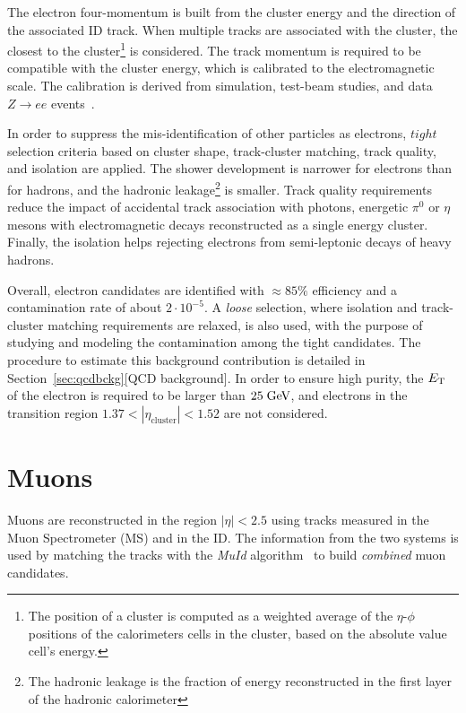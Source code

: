 The electron four-momentum is built from the cluster energy
and the direction of the associated ID track.
When multiple tracks are associated with the cluster, the closest
to the cluster\footnote{The position of a cluster 
is computed as a weighted average of the $\eta$-$\phi$ positions 
of the calorimeters cells in the cluster, based on the absolute 
value cell's energy.} is considered.
The track momentum is required to be compatible with the cluster energy,
which is calibrated to the electromagnetic scale. The calibration is
derived from simulation, test-beam studies, and data $Z\to ee$ 
events~\cite{elecalib}.

In order to suppress the mis-identification of other particles  
as electrons, $tight$ selection criteria based on cluster shape, 
track-cluster matching, track quality, and isolation are applied.
The shower development is narrower for electrons than for hadrons, and
the hadronic leakage\footnote{The hadronic leakage is the fraction of 
energy reconstructed in the first layer of the hadronic calorimeter}
is smaller. Track quality requirements reduce the impact of accidental 
track association with photons, energetic $\pi^0$ or $\eta$ mesons
with electromagnetic decays reconstructed as a single energy cluster.
Finally, the isolation helps rejecting electrons from semi-leptonic
decays of  heavy hadrons.

Overall, electron candidates are identified with \mbox{$\approx{}85\%$} 
efficiency and a contamination rate of about \mbox{$2\cdot{}10^{-5}$}.
A {\it loose} selection, where isolation and track-cluster matching
requirements are relaxed, is also used, with the purpose of studying
and modeling the contamination among the tight candidates. 
The procedure to estimate this background
contribution is detailed in Section~\ref{sec:qcdbckg}[QCD background].
In order to ensure high purity, the $\mbox{\ensuremath{E_{\mathrm{T}}}}$ of the electron is required
to be larger than \mbox{$25 \; \mathrm{GeV}{}$}, and electrons in the transition
region $1.37<|\eta_{\mathrm{cluster}}|<1.52$ are not considered.

\section{Muons}
\label{sec:muons}

Muons are reconstructed in the region $|\eta|<2.5$ using tracks
measured in the Muon Spectrometer (MS) and in the ID.
The information from the two systems is used by matching
the tracks with the {\it MuId} algorithm~\cite{muidalgo} to build 
{\it combined} muon candidates.

